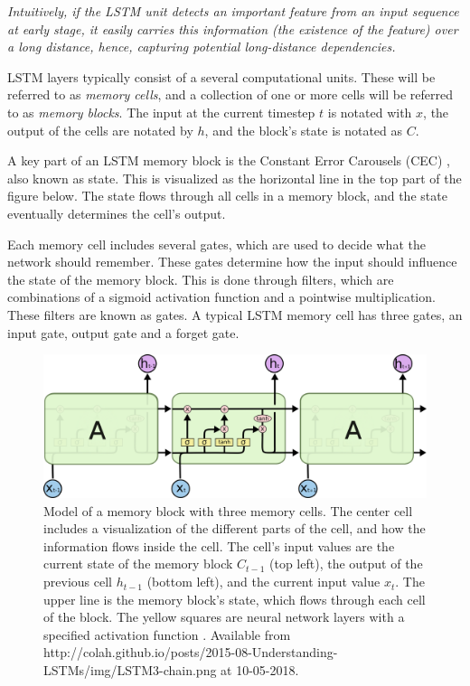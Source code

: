 \begin{displayquote}
    \textit{Intuitively, if the LSTM unit detects an important feature from an input sequence at early stage, it
    easily carries this information (the existence of the feature) over a long distance, hence, capturing
    potential long-distance dependencies.}{\cite{chung_empirical_2014}}
\end{displayquote}

LSTM layers typically consist of a several computational units. These will be referred to as \textit{memory cells}, and a collection of one or more cells will be referred to as \textit{memory blocks}. The input at the current timestep $t$ is notated with $x$, the output of the cells are notated by $h$, and the block's state is notated as $C$.

A key part of an LSTM memory block is the Constant Error Carousels (CEC) \cite{gers_learning_1999}, also known as state. This is visualized as the horizontal line in the top part of the figure below. The state flows through all cells in a memory block, and the state eventually determines the cell's output.

Each memory cell includes several gates, which are used to decide what the network should remember. These gates determine how the input should influence the state of the memory block. This is done through filters, which are combinations of a sigmoid activation function and a pointwise multiplication. These filters are known as gates. A typical LSTM memory cell has three gates, an input gate, output gate and a forget gate.

\begin{figure}[H]
    \centering
    \includegraphics[width=\textwidth]{Assets/Chapter2_Theory/LSTM3-chain.png}
    \caption{Model of a memory block with three memory cells. The center cell includes a visualization of the different parts of the cell, and how the information flows inside the cell. The cell's input values are the current state of the memory block $C_{t-1}$ (top left), the output of the previous cell $h_{t-1}$ (bottom left), and  the current input value $x_t$. The upper line is the memory block's state, which flows through each cell of the block. The yellow squares are neural network layers with a specified activation function \cite{_understanding_2015}. Available from http://colah.github.io/posts/2015-08-Understanding-LSTMs/img/LSTM3-chain.png at 10-05-2018.}
    \label{fig:lstm_cells}
\end{figure}

